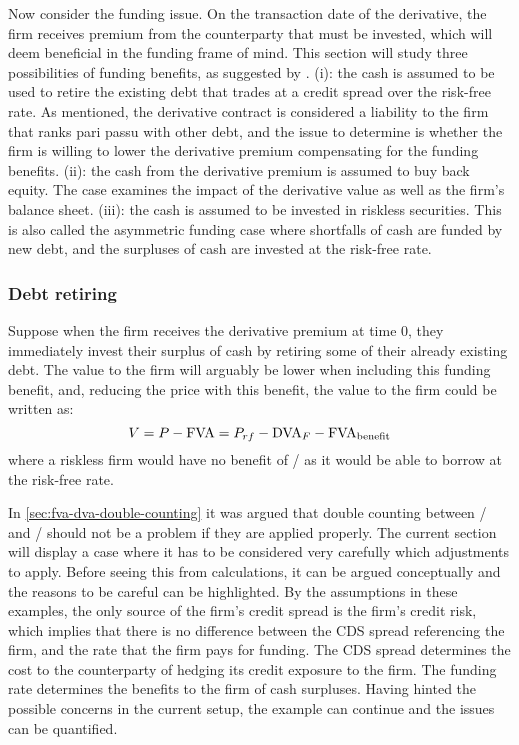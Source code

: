 \documentclass[../main.tex]{subfiles}
\begin{document}
        Now consider the funding issue. On the transaction date of the derivative, 
        the firm receives premium from the counterparty that must be invested, 
        which will deem beneficial in the funding frame of mind. 
        This section will study three possibilities of funding benefits, 
        as suggested by \textcite{Hillion2016}.
        (i): the cash is assumed to be used to retire the existing debt 
        that trades at a credit spread over the risk-free rate. 
        As mentioned, the derivative contract is considered a liability to the firm
        that ranks pari passu with other debt, 
        and the issue to determine is whether the firm is willing to lower the derivative premium 
        compensating for the funding benefits. 
        (ii): the cash from the derivative premium is assumed to buy back equity. 
        The case examines the impact of the derivative value as well as the firm's balance sheet. 
        (iii): the cash is assumed to be invested in riskless securities. 
        This is also called the asymmetric funding case where shortfalls of cash are funded by new debt, 
        and the surpluses of cash are invested at the risk-free rate.

        \subsubsection{Debt retiring}
            Suppose when the firm receives the derivative premium at time 0, 
            they immediately invest their surplus of cash by retiring some of their already existing debt. 
            The value to the firm will arguably be lower when including this funding benefit, 
            and, reducing the price with this benefit, the value to the firm could be written as:
            \begin{equation}
                V = P - \FVA/ = P_{rf} - \DVA/_F - \FBA/
            \end{equation}
            where a riskless firm would have no benefit of \FVA/ as it would be able to borrow at the risk-free rate.
            
            In \cref{sec:fva-dva-double-counting} it was argued that double counting
            between \FVA/ and \DVA/ should not be a problem if they are applied properly.
            The current section will display a case
            where it has to be considered very carefully which adjustments to apply.
            Before seeing this from calculations, it can be argued conceptually
            and the reasons to be careful can be highlighted.
            By the assumptions in these examples,
            the only source of the firm's credit spread is the firm's credit risk, 
            which implies that there is no difference between the CDS spread referencing the firm,
            and the rate that the firm pays for funding.
            The CDS spread determines the cost to the counterparty 
            of hedging its credit exposure to the firm.
            The funding rate determines the benefits to the firm of cash surpluses.
            Having hinted the possible concerns in the current setup, 
            the example can continue and the issues can be quantified.
\end{document}
